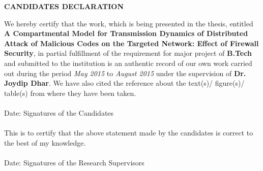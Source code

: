 \newpage

\quad
\newpage
\thispagestyle{empty}
\begin{center}
{\large \bf CANDIDATES DECLARATION}
\end{center}
We hereby certify that the work, which is being presented in the thesis, entitled {\bf A Compartmental Model for Transmission Dynamics of Distributed Attack of Malicious Codes on the Targeted Network: Effect of Firewall Security}, in partial fulfillment of the requirement for major project of {\bf B.Tech } and submitted to the institution is an authentic record of our own work carried out
during the period \emph{May 2015} to \emph{August 2015} under the supervision of {\bf Dr. Joydip Dhar}. We have also cited the reference about the text(s)/ figure(s)/ table(s) from where they have been taken.\\
\vspace{0.6in} \\
Date: \hspace{3.4in} Signatures of the Candidates \\
\vspace{1.6in} \\
This is to certify that the above statement made by the candidates is correct to the best of my knowledge. \\
\vspace{0.5in} \\
Date: \hspace{2.65in} Signatures of the Research Supervisors \\
